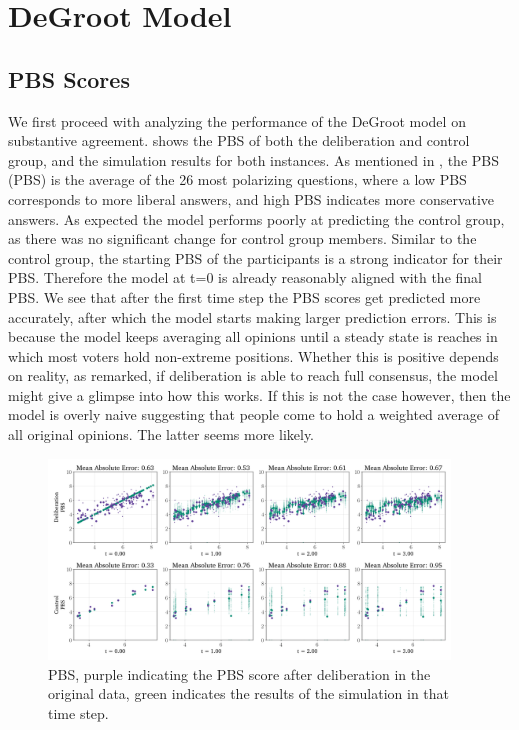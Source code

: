 \documentclass[11pt, oneside, dvipsnames]{Thesis} %
\title{\ttitle} %
\begin{document}
\section{DeGroot Model} \label{degroot_results} \subsection{PBS Scores} We
first proceed with analyzing the performance of the DeGroot model on
substantive agreement.  shows the PBS of both the
deliberation and control group, and the simulation results for both instances.
As mentioned in , the PBS (PBS) is the
average of the 26 most polarizing questions, where a low PBS corresponds to
more liberal answers, and high PBS indicates more conservative answers. As
expected the model performs poorly at predicting the control group, as there
was no significant change for control group members. Similar to the control
group, the starting  PBS of the participants is a strong indicator for
their  PBS. Therefore the model at t=0 is already reasonably aligned with
the final  PBS. We see that after the first time step the PBS scores get
predicted more accurately, after which the model starts making larger
prediction errors. This is because the model keeps averaging all opinions until
a steady state is reaches in which most voters hold non-extreme positions.
Whether this is positive depends on reality, as
\citet{elsterMARKETFORUMThree2002} remarked, if deliberation is able to reach
full consensus, the model might give a glimpse into how this works. If this is
not the case however, then the model is overly naive suggesting that people
come to hold a weighted average of all original opinions. The latter seems more
likely.


\begin{figure}
	\begin{center}
		\includegraphics[width=0.95\textwidth]{Figures/pbs_scores.png}
	\end{center}
	\caption{ PBS, purple indicating the PBS score after deliberation in the original data, green indicates the results of the simulation in that time step.}\label{fig:pbs}
\end{figure}
\end{document}

